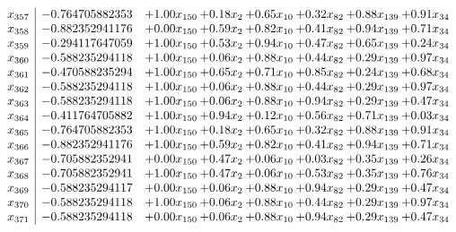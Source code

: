 \documentclass[8pt]{article}
\begin{document}
\[\begin{array}{c| c c@{\hskip 2pt} c@{\hskip 2pt} c@{\hskip 2pt} c@{\hskip 2pt} c@{\hskip 2pt} c@{\hskip 2pt} }
 x_{357}   &  -0.764705882353 & +  1.00 x_{150} & +  0.18 x_{2} & +  0.65 x_{10} & +  0.32 x_{82} & +  0.88 x_{139} & +  0.91 x_{34}\\
 x_{358}   &  -0.882352941176 & +  0.00 x_{150} & +  0.59 x_{2} & +  0.82 x_{10} & +  0.41 x_{82} & +  0.94 x_{139} & +  0.71 x_{34}\\
 x_{359}   &  -0.294117647059 & +  1.00 x_{150} & +  0.53 x_{2} & +  0.94 x_{10} & +  0.47 x_{82} & +  0.65 x_{139} & +  0.24 x_{34}\\
 x_{360}   &  -0.588235294118 & +  1.00 x_{150} & +  0.06 x_{2} & +  0.88 x_{10} & +  0.44 x_{82} & +  0.29 x_{139} & +  0.97 x_{34}\\
 x_{361}   &  -0.470588235294 & +  1.00 x_{150} & +  0.65 x_{2} & +  0.71 x_{10} & +  0.85 x_{82} & +  0.24 x_{139} & +  0.68 x_{34}\\
 x_{362}   &  -0.588235294118 & +  1.00 x_{150} & +  0.06 x_{2} & +  0.88 x_{10} & +  0.44 x_{82} & +  0.29 x_{139} & +  0.97 x_{34}\\
 x_{363}   &  -0.588235294118 & +  1.00 x_{150} & +  0.06 x_{2} & +  0.88 x_{10} & +  0.94 x_{82} & +  0.29 x_{139} & +  0.47 x_{34}\\
 x_{364}   &  -0.411764705882 & +  1.00 x_{150} & +  0.94 x_{2} & +  0.12 x_{10} & +  0.56 x_{82} & +  0.71 x_{139} & +  0.03 x_{34}\\
 x_{365}   &  -0.764705882353 & +  1.00 x_{150} & +  0.18 x_{2} & +  0.65 x_{10} & +  0.32 x_{82} & +  0.88 x_{139} & +  0.91 x_{34}\\
 x_{366}   &  -0.882352941176 & +  1.00 x_{150} & +  0.59 x_{2} & +  0.82 x_{10} & +  0.41 x_{82} & +  0.94 x_{139} & +  0.71 x_{34}\\
 x_{367}   &  -0.705882352941 & +  0.00 x_{150} & +  0.47 x_{2} & +  0.06 x_{10} & +  0.03 x_{82} & +  0.35 x_{139} & +  0.26 x_{34}\\
 x_{368}   &  -0.705882352941 & +  1.00 x_{150} & +  0.47 x_{2} & +  0.06 x_{10} & +  0.53 x_{82} & +  0.35 x_{139} & +  0.76 x_{34}\\
 x_{369}   &  -0.588235294117 & +  0.00 x_{150} & +  0.06 x_{2} & +  0.88 x_{10} & +  0.94 x_{82} & +  0.29 x_{139} & +  0.47 x_{34}\\
 x_{370}   &  -0.588235294118 & +  1.00 x_{150} & +  0.06 x_{2} & +  0.88 x_{10} & +  0.44 x_{82} & +  0.29 x_{139} & +  0.97 x_{34}\\
 x_{371}   &  -0.588235294118 & +  0.00 x_{150} & +  0.06 x_{2} & +  0.88 x_{10} & +  0.94 x_{82} & +  0.29 x_{139} & +  0.47 x_{34}\\

\end{array}\]
\end{document}
